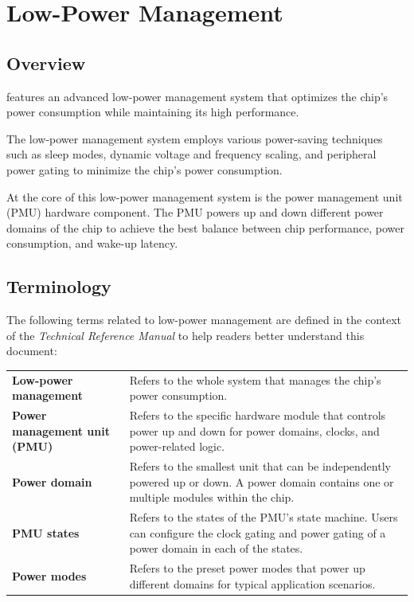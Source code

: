 \documentclass[main\_\_EN.tex]{subfiles}
\begin{document}

\ifglobal
\else
    \listoftodos
    {\let\clearpage\relax \listofdonetodos}
    \tableofcontents
\fi



\hypertarget{lowpowm}{}
\chapter{Low-Power Management}\label{mod:lowpowm}

\section{Overview}

\chipname{} features an advanced low-power management system that optimizes the chip's power consumption while maintaining its high performance.

The low-power management system employs various power-saving techniques such as sleep modes, dynamic voltage and frequency scaling, and peripheral power gating to minimize the chip's power consumption.

At the core of this low-power management system is the power management unit (PMU) hardware component. The PMU powers up and down different power domains of the chip to achieve the best balance between chip performance, power consumption, and wake-up latency.

\section{Terminology}

The following terms related to low-power management are defined in the context of the \textit{\chipname{} Technical Reference Manual}
to help readers better understand this document:

\begin{longtable}[c]{ R{6cm} p{10cm} }
\textbf{Low-power management} & Refers to the whole system that manages the chip's power consumption. \\
\textbf{Power management unit (PMU)} & Refers to the specific hardware module that controls power up and down for power domains, clocks, and power-related logic. \\
\textbf{Power domain} & Refers to the smallest unit that can be independently powered up or down. A power domain contains one or multiple modules within the chip. \\
\textbf{PMU states} & Refers to the states of the PMU's state machine. Users can configure the clock gating and power gating of a power domain in each of the states.\\
\textbf{Power modes} & Refers to the preset power modes that power up different domains for typical application scenarios.\\
\end{longtable}
\end{document}
